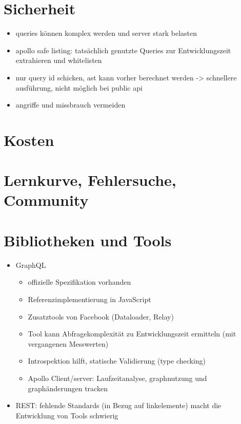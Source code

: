 \section{Sicherheit}
\begin{itemize}
  \item queries können komplex werden und server stark belasten
  \item apollo safe listing: tatsächlich genutzte Queries zur Entwicklungszeit extrahieren und whitelisten
  \item nur query id schicken, ast kann vorher berechnet werden -> schnellere ausführung, nicht möglich bei public api
  \item angriffe und missbrauch vermeiden
\end{itemize}

\section{Kosten}

\section{Lernkurve, Fehlersuche, Community}

\section{Bibliotheken und Tools}
\begin{itemize}
  \item GraphQL
  \begin{itemize}
    \item offizielle Spezifikation vorhanden
    \item Referenzimplementierung in JavaScript
    \item Zusatztools von Facebook (Dataloader, Relay)
    \item Tool kann Abfragekomplexität zu Entwicklungszeit ermitteln (mit vergangenen Messwerten)
    \item Introspektion hilft, statische Validierung (type checking)
    \item Apollo Client/server: Laufzeitanalyse, graphnutzung und graphänderungen tracken
  \end{itemize}
  \item REST: fehlende Standards (in Bezug auf linkelemente) macht die Entwicklung von Tools schwierig
\end{itemize}
